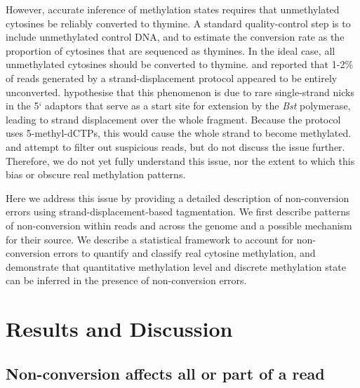 \documentclass[12pt,longbibliography]{article}
\begin{document}
However, accurate inference of methylation states requires that unmethylated cytosines be reliably converted to thymine.
A standard quality-control step is to include unmethylated control DNA, and to estimate the conversion rate as the proportion of cytosines that are sequenced as thymines.
In the ideal case, all unmethylated cytosines should be converted to thymine.
\textcite{lu2015improved} and \textcite{suzuki2018whole} reported that 1-2\% of reads generated by a strand-displacement protocol appeared to be entirely unconverted.
\textcite{lu2015improved} hypothesise that this phenomenon is due to rare single-strand nicks in the 5` adaptors that serve as a start site for extension by the \textit{Bst} polymerase, leading to strand displacement over the whole fragment.
Because the protocol uses 5-methyl-dCTPs, this would cause the whole strand to become methylated.
\textcite{lu2015improved} and \textcite{suzuki2018whole} attempt to filter out suspicious reads, but do not discuss the issue further.
Therefore, we do not yet fully understand this issue, nor the extent to which this bias or obscure real methylation patterns.

Here we address this issue by providing a detailed description of non-conversion errors using strand-displacement-based tagmentation.
We first describe patterns of non-conversion within reads and across the genome and a possible mechanism for their source.
We describe a statistical framework to account for non-conversion errors to quantify and classify real cytosine methylation, and demonstrate that quantitative methylation level and discrete methylation state can be inferred in the presence of non-conversion errors.

\section{Results and Discussion}

\subsection{Non-conversion affects all or part of a read}
\end{document}

